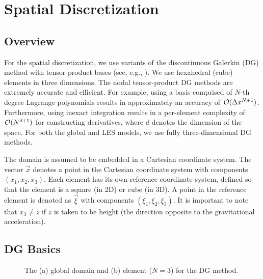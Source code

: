 \documentclass{report}
\begin{document}
{\section{Spatial Discretization}

\subsection{Overview}
For the spatial discretization, we use variants of the discontinuous Galerkin (DG) method with tensor-product bases (see, e.g., \citealt{giraldo:2008a, abdi:2016}). We use hexahedral (cube) elements in three dimensions.  The nodal tensor-product DG methods are extremely accurate and efficient.  For example, using a basis comprised of $N$-th degree Lagrange polynomials results in approximately an accuracy of $\mathcal{O}(\Delta x^{N+1})$. Furthermore, using inexact integration results in a per-element complexity of $\mathcal{O}(N^{d+1})$ for constructing derivatives, where $d$ denotes the dimension of the space. For both the global and LES models, we use fully three-dimensional DG methods.

The domain is assumed to be embedded in a Cartesian
coordinate system. The vector $\vec{x}$ denotes a point in the Cartesian
coordinate system with components $(x_{1}, x_{2},
x_{3})$. Each element has its own reference coordinate system, defined
so that the element is a square (in 2D) or cube (in
3D). A point in the reference element is denoted as $\vec{\xi}$ with components $(\xi_{1}, \xi_{2}, \xi_{3})$.
It is important to note that $x_{3} \ne z$ if $z$ is taken to be height (the
direction opposite to the gravitational acceleration).

\subsection{DG Basics}

\begin{figure}[htbp]
\begin{center}
\end{center}
\caption{The (a) global domain and (b) element ($N=3$) for the DG method.}
\label{fig:spatial_discretization/dg_method}
\end{figure}

}
\end{document}
